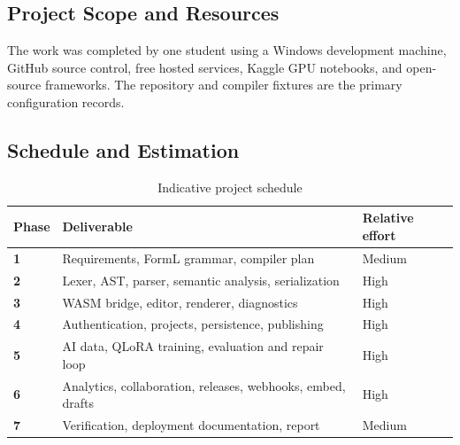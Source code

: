 \documentclass[12pt,a4paper,oneside]{report}
\begin{document}
\subsection{Project Scope and Resources}
The work was completed by one student using a Windows development machine, GitHub source
control, free hosted services, Kaggle GPU notebooks, and open-source frameworks. The repository
and compiler fixtures are the primary configuration records.

\subsection{Schedule and Estimation}
\begin{table}[H]
\centering
\caption{Indicative project schedule}
\label{tab:schedule}
\begin{tabularx}{\textwidth}{>{\bfseries}p{}X p{}}
\toprule
Phase & Deliverable & Relative effort\\
\midrule
1 & Requirements, FormL grammar, compiler plan & Medium\\
2 & Lexer, AST, parser, semantic analysis, serialization & High\\
3 & WASM bridge, editor, renderer, diagnostics & High\\
4 & Authentication, projects, persistence, publishing & High\\
5 & AI data, QLoRA training, evaluation and repair loop & High\\
6 & Analytics, collaboration, releases, webhooks, embed, drafts & High\\
7 & Verification, deployment documentation, report & Medium\\
\bottomrule
\end{tabularx}
\end{table}
\end{document}
